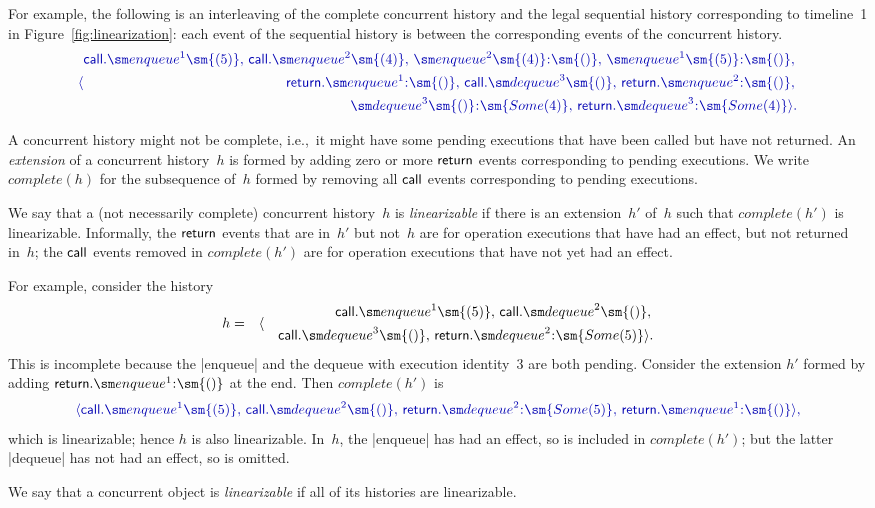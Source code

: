 For example, the following is an interleaving of the complete concurrent
history and the legal sequential history corresponding to timeline~1 in
Figure~\ref{fig:linearization}: each event of the sequential history is
between the corresponding events of the concurrent history. 
\[\mstyle
\langle
  \begin{align}
  \call.\enqueue^1\sm{(5)},\, \call.\enqueue^2\sm{(4)},\,  
  \enqueue^2\sm{(4)}\::\sm{()},\,
  \enqueue^1\sm{(5)}\::\sm{()},\, \\
\quad
  \return.\enqueue^1\::\sm{()}, \,
  \call.\dequeue^3\sm{()},\, \return.\enqueue^2\::\sm{()},\, \\
\quad
  \dequeue^3\sm{()}\::\sm{Some(4)},\,
  \return.\dequeue^3\::\sm{Some(4)} \rangle .
  \end{align}
\]

A concurrent history might not be complete, i.e.,~it might have some pending
executions that have been called but have not returned.  An
\emph{extension} of a concurrent history~$h$ is formed by
adding zero or more $\mathsf{return}$ events corresponding to pending executions.  We
write $complete(h)$ for the subsequence of~$h$ formed by removing all $\mathsf{call}$
events corresponding to pending executions.

We say that a (not necessarily complete) concurrent history~$h$ is
\emph{linearizable} if there is an extension~$h'$ of~$h$ such that
$complete(h')$ is linearizable.  Informally, the $\mathsf{return}$ events that are
in~$h'$ but not~$h$ are for operation executions that have had an effect, but
not returned in~$h$; the $\mathsf{call}$ events removed in $complete(h')$ are for
operation executions that have not yet had an effect.

For example, consider the history
\begin{eqnarray*}
h & = & \langle
  \begin{align} 
  \call.\enqueue^1\sm{(5)},\, \call.\dequeue^2\sm{()},\, \\
  \quad  \call.\dequeue^3\sm{()},\,  \return.\dequeue^2\::\sm{Some(5)} \rangle.
  \end{align}
\end{eqnarray*}
This is incomplete because the |enqueue| and the dequeue with execution
identity~$3$ are both pending.  Consider the extension $h'$ formed by adding
$\return.\enqueue^1\::\sm{()}$ at the end.  Then $complete(h')$ is
\[\mstyle
\langle 
  \call.\enqueue^1\sm{(5)},\, \call.\dequeue^2\sm{()},\,
  \return.\dequeue^2\::\sm{Some(5)},\, \return.\enqueue^1\::\sm{()}\rangle,
\]
which is linearizable; hence $h$ is also linearizable.  In~$h$, the |enqueue|
has had an effect, so is included in $complete(h')$; but the latter |dequeue|
has not had an effect, so is omitted.

We say that a concurrent object is \emph{linearizable} if
all of its histories are linearizable.


